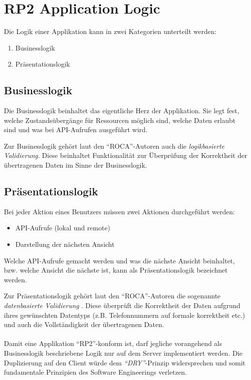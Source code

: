 \section{RP2 Application Logic}
\label{sec:principle-rp2-application-logic}

Die Logik einer Applikation kann in zwei Kategorien unterteilt werden:
\begin{enumerate}
	\item Businesslogik
	\item Präsentationslogik
\end{enumerate}

\subsection*{Businesslogik}
Die Businesslogik beinhaltet das eigentliche Herz der Applikation. Sie legt fest, welche Zustandsübergänge für Ressourcen möglich sind, welche Daten erlaubt sind und was bei API-Aufrufen ausgeführt wird.

Zur Businesslogik gehört laut den ``ROCA''-Autoren auch die \emph{logikbasierte Validierung}. Diese beinhaltet \cite{ObjektspektrumROCA} Funktionalität zur Überprüfung der Korrektheit der übertragenen Daten im Sinne der Businesslogik.

\subsection*{Präsentationslogik}
Bei jeder Aktion eines Benutzers müssen zwei Aktionen durchgeführt werden:
\begin{itemize}
	\item API-Aufrufe (lokal und remote)
	\item Darstellung der nächsten Ansicht
\end{itemize}
Welche API-Aufrufe gemacht werden und was die nächste Ansicht beinhaltet, bzw. welche Ansicht die nächste ist, kann als Präsentationslogik bezeichnet werden.

Zur Präsentationslogik gehört laut den ``ROCA''-Autoren die sogenannte \emph{datenbasierte Validierung} \cite{ObjektspektrumROCA}. Diese überprüft die Korrektheit der Daten aufgrund ihres gewünschten Datentyps (z.B. Telefonnummern auf formale korrektheit etc.) und auch die Vollständigkeit der übertragenen Daten.
\\ \\
Damit eine Applikation ``RP2''-konform ist, darf jegliche vorangehend als Businesslogik beschriebene Logik nur auf dem Server implementiert werden. Die Duplizierung auf den Client würde dem \emph{``\gls{DRY}''}-Prinzip widersprechen und somit fundamentale Prinzipien des Software Engineerings verletzen.

